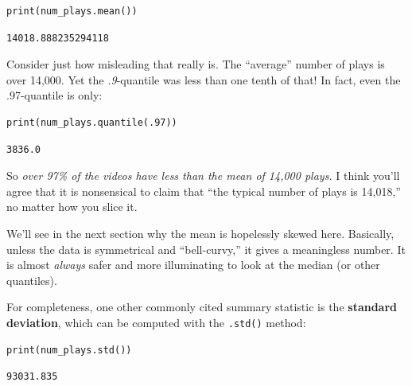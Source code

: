 \begin{Verbatim}[fontsize=\small,samepage=true,frame=single,framesep=3mm]
print(num_plays.mean())
\end{Verbatim}
\vspace{-.3in}

\begin{Verbatim}[fontsize=\small,samepage=true,frame=leftline,framesep=5mm,framerule=1mm]
14018.888235294118
\end{Verbatim}

Consider just how misleading that really is. The ``average'' number of plays is
over 14,000. Yet the \textit{.9}-quantile was less than one tenth of that!
In fact, even the .97-quantile is only:

\begin{Verbatim}[fontsize=\small,samepage=true,frame=single,framesep=3mm]
print(num_plays.quantile(.97))
\end{Verbatim}
\vspace{-.3in}

\begin{Verbatim}[fontsize=\small,samepage=true,frame=leftline,framesep=5mm,framerule=1mm]
3836.0
\end{Verbatim}

So \textit{over 97\% of the videos have less than the mean of 14,000 plays.} I
think you'll agree that it is nonsensical to claim that ``the typical number of
plays is 14,018,'' no matter how you slice it.


We'll see in the next section why the mean is hopelessly skewed here.
Basically, unless the data is symmetrical and ``bell-curvy,'' it gives a
meaningless number. It is almost \textit{always} safer and more illuminating to
look at the median (or other quantiles).

\label{standardDeviation}

For completeness, one other commonly cited summary statistic is the
\textbf{standard deviation}, which can be computed with the \texttt{.std()}
method:

\begin{Verbatim}[fontsize=\small,samepage=true,frame=single,framesep=3mm]
print(num_plays.std())
\end{Verbatim}
\vspace{-.3in}

\begin{Verbatim}[fontsize=\small,samepage=true,frame=leftline,framesep=5mm,framerule=1mm]
93031.835
\end{Verbatim}

